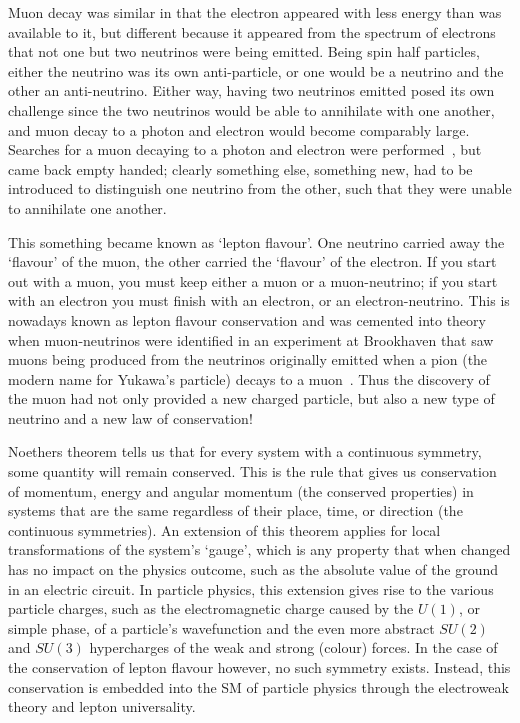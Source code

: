 Muon decay was similar in that the electron appeared with less energy than was available to it, but different because it appeared from the spectrum of electrons that not one but two neutrinos were being emitted.
Being spin half particles, either the neutrino was its own anti-particle, or one would be a neutrino and the other an anti-neutrino.
Either way, having two neutrinos emitted posed its own challenge since the two neutrinos would be able to annihilate with one another, and muon decay to a photon and electron would become comparably large.
Searches for a muon decaying to a photon and electron were performed~\cite{Hincks194802}, but came back empty handed;
clearly something else, something new, had to be introduced to distinguish one neutrino from the other, such that they were unable to annihilate one another.
\FigTheoryHincksPontecorvoMuEGamma

This something became known as 	`lepton flavour'.  
One neutrino carried away the `flavour' of the muon, the other carried the `flavour' of the electron.
If you start out with a muon, you must keep either a muon or a muon-neutrino; if you start with an electron you must finish with an electron, or an electron-neutrino.
This is nowadays known as lepton flavour conservation and was cemented into theory when muon-neutrinos were identified in an experiment at Brookhaven that saw muons being produced from the neutrinos originally emitted when
a pion (the modern name for Yukawa's particle) decays to a muon~\cite{MuNeutrinoDiscovery}.
Thus the discovery of the muon had not only provided a new charged particle, but also a new type of neutrino and a new law of conservation!

Noethers theorem tells us that for every system with a continuous symmetry, some quantity will remain conserved.
This is the rule that gives us conservation of momentum, energy and angular momentum (the conserved properties) in systems that are the same regardless of their place, time, or direction (the continuous symmetries).
An extension of this theorem applies for local transformations of the system's `gauge', which is any property that when changed has no impact on the physics outcome, such as the absolute value of the ground in an electric circuit.
In particle physics, this extension gives rise to the various particle charges, such as the electromagnetic charge caused by the $U(1)$, or simple phase, of a particle's wavefunction and the even more abstract $SU(2)$ and $SU(3)$ hypercharges of the weak and strong (colour) forces.
In the case of the conservation of lepton flavour however, no such symmetry exists.
Instead, this conservation is embedded into the \ac{SM} of particle physics through the electroweak theory and lepton universality.

